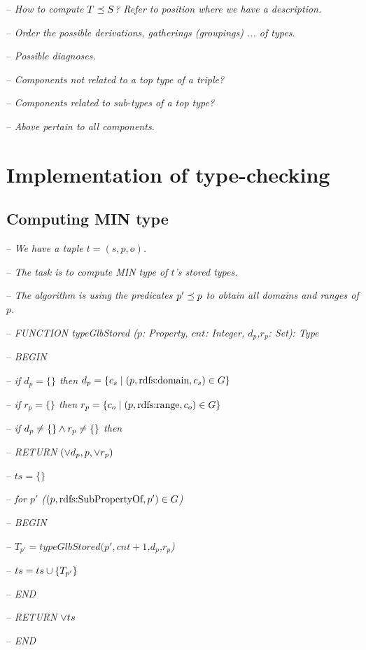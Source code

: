 \documentclass[runningheads]{llncs}
\newcommand{\memo}[1]{}
\newcommand{\notes}[1]{\noindent\begin{small}-- \emph{#1}\hfill\break\end{small}}
\newcommand{\nnotes}[1]{\indent\begin{small}-- \emph{#1}\hfill\break\end{small}}
\begin{document}
\medskip

\medskip
\notes{How to compute $T\preceq\/S$? Refer to position where we have a description.}
\notes{Order the possible derivations, gatherings (groupings) ... of types.}

\notes{Possible diagnoses.}
\notes{Components not related to a top type of a triple?}
\notes{Components related to sub-types of a top type?}
\notes{Above pertain to all components.}



\memo{
\subsection{Typing a graph}

\notes{What is a type of a graph?}
\nnotes{A type of a graph is a graph!}
\nnotes{It includes a set of triple types forming a schema graph.}

\notes{Typing schema triples?}
\nnotes{What can be checked?}
\nnotes{Is a schema triple properly related to the super-classes and types of components.}
\nnotes{Consistency of the placement of a class in an ontology.}
\nnotes{A class or predicate component not related to other classes?}
\nnotes{A class or predicate component attached to ``conflicting'' set of classes? ?}
\nnotes{Any other examples?}

\notes{Typing a graph.}
\nnotes{Checking whether triple types match in the meeting points.}
\nnotes{What is the type in meeting points of two triple types?}
\nnotes{Since a tye of a graph should present any legal triple in $\D$}
}


\section{Implementation of type-checking}


\subsection{Computing MIN type\label{sec:alg-MIN}}


\notes{We have a tuple $t=(s,p,o)$.}
\nnotes{The task is to compute MIN type of $t$'s stored types.}
\nnotes{The algorithm is using the predicates $p'\preceq\/p$ to obtain all domains and ranges of $p$.}



\notes{FUNCTION typeGlbStored ($p$: Property, $cnt$: Integer, $d_p$,$r_p$: Set): Type}
\notes{BEGIN}
\notes{if $d_p=\{\}$ then $d_p =  \{ c_s \mid (p,\text{rdfs:domain},c_s)\in\/G\}$}
\notes{if $r_p=\{\}$ then $r_p =  \{ c_o \mid (p,\text{rdfs:range},c_o)\in\/G\}$}
\notes{if $d_p\not=\{\}\land\/r_p\not=\{\}$ then }
\notes{RETURN $(\lor\/d_p,p,\lor\/r_p)$}
\notes{$ts = \{\}$}
\notes{for $p'$ ($(p,\text{rdfs:SubPropertyOf},p')\in\/G$)}
\notes{BEGIN}
\notes{$T_{p'} = typeGlbStored(p',cnt+1$,$d_p$,$r_p$)}
\notes{$ts = ts\cup\/\{T_{p'}\}$}
\notes{END}
\notes{RETURN $\lor\/ts$}
\notes{END}
\end{document}
